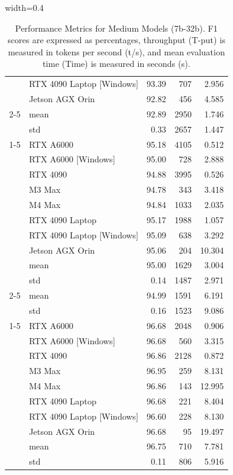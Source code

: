 \documentclass[conference]{IEEEtran}
\begin{document}
\begin{table}[htbp]
\begin{adjustbox}{width=0.4\textwidth}
\begin{tabular}{llrrr}
 & RTX 4090 Laptop [Windows] & 93.39 & 707 & 2.956 \\
 & Jetson AGX Orin & 92.82 & 456 & 4.585 \\
 \cmidrule(lr){2-5}
 & mean & 92.89 & 2950 & 1.746 \\
 & std & 0.33 & 2657 & 1.447 \\
\cline{1-5}
\multirow[t]{10}{*}{qwen2.5:14b} & RTX A6000 & 95.18 & 4105 & 0.512 \\
 & RTX A6000 [Windows] & 95.00 & 728 & 2.888 \\
 & RTX 4090 & 94.88 & 3995 & 0.526 \\
 & M3 Max & 94.78 & 343 & 3.418 \\
 & M4 Max & 94.84 & 1033 & 2.035 \\
 & RTX 4090 Laptop & 95.17 & 1988 & 1.057 \\
 & RTX 4090 Laptop [Windows] & 95.09 & 638 & 3.292 \\
 & Jetson AGX Orin & 95.06 & 204 & 10.304 \\
 & mean & 95.00 & 1629 & 3.004 \\
 & std & 0.14 & 1487 & 2.971 \\
 \cmidrule(lr){2-5}
 & mean & 94.99 & 1591 & 6.191 \\
 & std & 0.16 & 1523 & 9.086 \\
\cline{1-5}
\multirow[t]{10}{*}{qwen2.5:32b} & RTX A6000 & 96.68 & 2048 & 0.906 \\
 & RTX A6000 [Windows] & 96.68 & 560 & 3.315 \\
 & RTX 4090 & 96.86 & 2128 & 0.872 \\
 & M3 Max & 96.95 & 259 & 8.131 \\
 & M4 Max & 96.86 & 143 & 12.995 \\
 & RTX 4090 Laptop & 96.68 & 221 & 8.404 \\
 & RTX 4090 Laptop [Windows] & 96.60 & 228 & 8.130 \\
 & Jetson AGX Orin & 96.68 & 95 & 19.497 \\
 & mean & 96.75 & 710 & 7.781 \\
 & std & 0.11 & 806 & 5.916 \\
\bottomrule
\end{tabular}
    \end{adjustbox}
    \caption{Performance Metrics for Medium Models (7b-32b). F1 scores are expressed as percentages, throughput (T-put) is measured in tokens per second (t/s), and mean evaluation time (Time) is measured in seconds (s).}
    \label{tab:medium-models}
\end{table}
\end{document}
